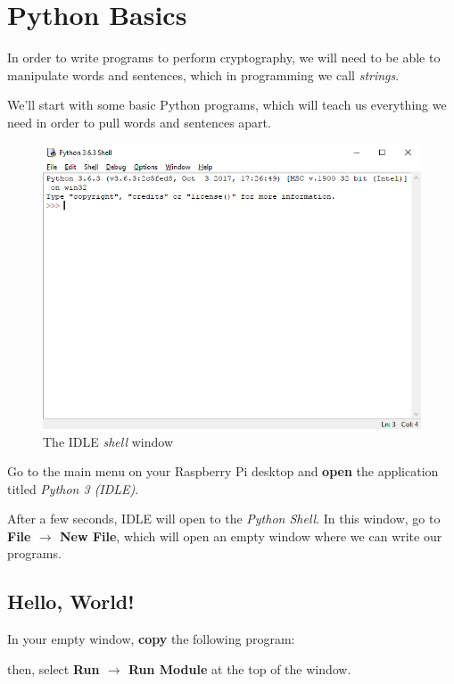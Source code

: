 \section{Python Basics}

	In order to write programs to perform cryptography, we will need to be able to manipulate words and sentences, which in programming we call \textit{strings}.
	
	We'll start with some basic Python programs, which will teach us everything we need in order to pull words and sentences apart.
	
	\begin{figure}[h]
		\centering
		\includegraphics[width=0.8\linewidth]{McrRaspJam/016_Ciphers/1_python/idle}
		\caption{The IDLE \textit{shell} window}
		\label{fig:idle}
	\end{figure}
	
	Go to the main menu on your Raspberry Pi desktop and \textbf{open} the application titled \textit{Python 3 (IDLE)}.
	
	After a few seconds, IDLE will open to the \textit{Python Shell}. In this window, go to \textbf{File $\rightarrow$ New File}, which will open an empty window where we can write our programs.
	
	\subsection*{Hello, World!}
		
		In your empty window, \textbf{copy} the following program:
		
		
		
		then, select \textbf{Run $\rightarrow$ Run Module} at the top of the window.
		
